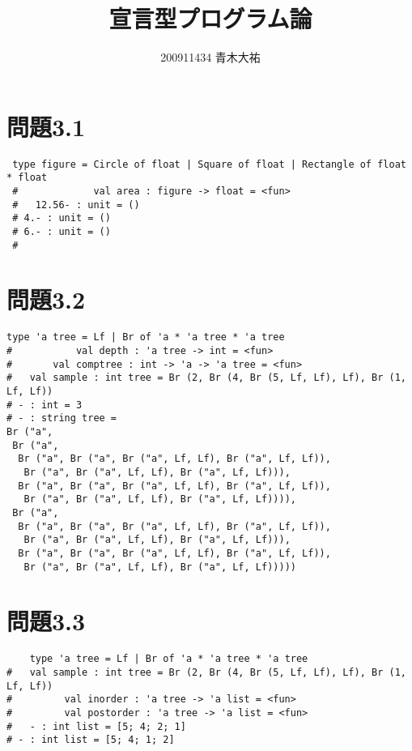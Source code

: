 \documentclass[a4paper,12pt]{jarticle}
\title{宣言型プログラム論}
\author{200911434 青木大祐}
\begin{document}
\maketitle
\newpage

\section*{問題3.1}

\begin{lstlisting}
 type figure = Circle of float | Square of float | Rectangle of float * float
 #             val area : figure -> float = <fun>
 #   12.56- : unit = ()
 # 4.- : unit = ()
 # 6.- : unit = ()
 # 
\end{lstlisting}

\section*{問題3.2}

\begin{lstlisting}
type 'a tree = Lf | Br of 'a * 'a tree * 'a tree
#           val depth : 'a tree -> int = <fun>
#       val comptree : int -> 'a -> 'a tree = <fun>
#   val sample : int tree = Br (2, Br (4, Br (5, Lf, Lf), Lf), Br (1, Lf, Lf))
# - : int = 3
# - : string tree =
Br ("a",
 Br ("a",
  Br ("a", Br ("a", Br ("a", Lf, Lf), Br ("a", Lf, Lf)),
   Br ("a", Br ("a", Lf, Lf), Br ("a", Lf, Lf))),
  Br ("a", Br ("a", Br ("a", Lf, Lf), Br ("a", Lf, Lf)),
   Br ("a", Br ("a", Lf, Lf), Br ("a", Lf, Lf)))),
 Br ("a",
  Br ("a", Br ("a", Br ("a", Lf, Lf), Br ("a", Lf, Lf)),
   Br ("a", Br ("a", Lf, Lf), Br ("a", Lf, Lf))),
  Br ("a", Br ("a", Br ("a", Lf, Lf), Br ("a", Lf, Lf)),
   Br ("a", Br ("a", Lf, Lf), Br ("a", Lf, Lf)))))
\end{lstlisting}

\section*{問題3.3}

\begin{lstlisting}
    type 'a tree = Lf | Br of 'a * 'a tree * 'a tree
#   val sample : int tree = Br (2, Br (4, Br (5, Lf, Lf), Lf), Br (1, Lf, Lf))
#         val inorder : 'a tree -> 'a list = <fun>
#         val postorder : 'a tree -> 'a list = <fun>
#   - : int list = [5; 4; 2; 1]
# - : int list = [5; 4; 1; 2]
\end{lstlisting}
\end{document}
